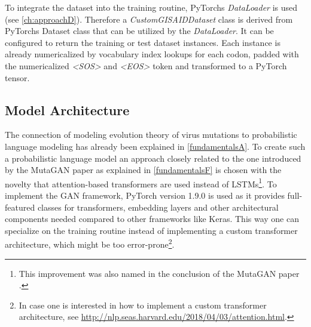 To integrate the dataset into the training routine, PyTorchs \textit{DataLoader} is used (see \autoref{ch:approachD}). Therefore a \textit{CustomGISAIDDataset} class is derived from PyTorchs Dataset class that can be utilized by the \textit{DataLoader}. It can be configured to return the training or test dataset instances. Each instance is already numericalized by vocabulary index lookups for each codon, padded with the numericalized \textit{<SOS>} and \textit{<EOS>} token and transformed to a PyTorch tensor. 

\subsection{Model Architecture} \label{approachC}

The connection of modeling evolution theory of virus mutations to probabilistic language modeling has already been explained in \autoref{fundamentalsA}. To create such a probabilistic language model an approach closely related to the one introduced by the MutaGAN paper \cite{Berman2020} as explained in \autoref{fundamentalsF} is chosen with the novelty that attention-based transformers are used instead of \acp{LSTM}\footnote{This improvement was also named in the conclusion of the MutaGAN paper \cite{Berman2020}.}. To implement the \ac{GAN} framework, PyTorch version 1.9.0 is used as it provides full-featured classes for transformers, embedding layers and other architectural components needed compared to other frameworks like Keras. This way one can specialize on the training routine instead of implementing a custom transformer architecture, which might be too error-prone\footnote{In case one is interested in how to implement a custom transformer architecture, see \url{http://nlp.seas.harvard.edu/2018/04/03/attention.html}.}. 

